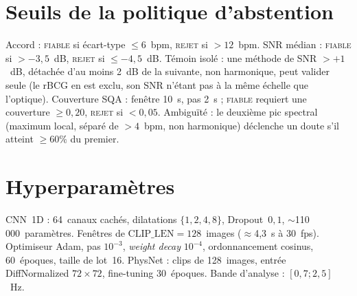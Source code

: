 \documentclass[11pt]{article}
\begin{document}
\appendix
\section{Seuils de la politique d'abstention}
\label{app:seuils}
Accord : \textsc{fiable} si écart-type $\leq 6$~bpm, \textsc{rejet} si $>12$~bpm.
SNR médian : \textsc{fiable} si $>-3{,}5$~dB, \textsc{rejet} si $\leq -4{,}5$~dB.
Témoin isolé : une méthode de SNR $>+1$~dB, détachée d'au moins 2~dB de la suivante,
non harmonique, peut valider seule (le rBCG en est exclu, son SNR n'étant pas à la
même échelle que l'optique). Couverture SQA : fenêtre 10~s, pas 2~s ; \textsc{fiable}
requiert une couverture $\geq 0{,}20$, \textsc{rejet} si $<0{,}05$. Ambiguïté : le
deuxième pic spectral (maximum local, séparé de $>4$~bpm, non harmonique) déclenche un
doute s'il atteint $\geq 60\%$ du premier.

\section{Hyperparamètres}
\label{app:hp}
CNN~1D : 64~canaux cachés, dilatations $\{1,2,4,8\}$, Dropout~$0{,}1$,
$\sim$110\,000~paramètres. Fenêtres de $\mathrm{CLIP\_LEN}=128$~images
($\approx$4{,}3~s à 30~fps). Optimiseur Adam, pas $10^{-3}$, \emph{weight decay}
$10^{-4}$, ordonnancement cosinus, 60~époques, taille de lot~16. PhysNet : clips de
128~images, entrée DiffNormalized $72\times72$, fine-tuning 30~époques. Bande
d'analyse : $[0{,}7;2{,}5]$~Hz.
\end{document}
